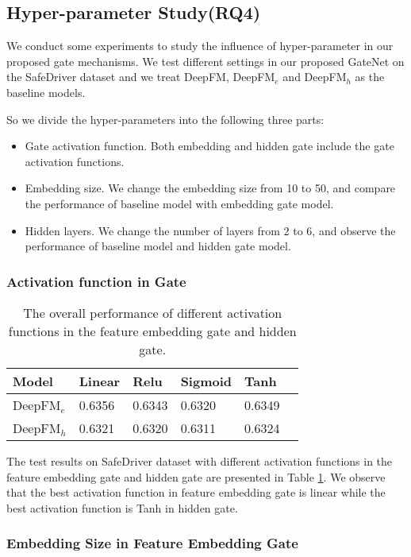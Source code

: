 \documentclass[sigconf,nonacm=true]{acmart}
\begin{document}
\subsection{Hyper-parameter Study(RQ4)}
We conduct some experiments to study the influence of hyper-parameter in our proposed gate mechanisms.
We test different settings in our proposed GateNet on the SafeDriver dataset and 
we treat DeepFM, DeepFM$_e$ and DeepFM$_h$ as the baseline models.

So we divide the hyper-parameters into the following three parts: 
\begin{itemize}
  \item Gate activation function. Both embedding and hidden gate include the gate activation functions.
  \item Embedding size. We change the embedding size from 10 to 50, and compare the performance of baseline model with embedding gate model.
  \item Hidden layers. We change the number of layers from 2 to 6, and observe the performance of baseline model and hidden gate model.
\end{itemize}

\subsubsection{Activation function in Gate}
\begin{table}[!htbp]
  \centering
  \caption{The overall performance of different activation functions in the feature embedding gate and hidden gate.}
  \label{table:t6}
  \begin{tabular}{llllll}
    Model & Linear & Relu & Sigmoid & Tanh\\ \hline
    DeepFM$_{e}$ & 0.6356 & 0.6343 & 0.6320 & 0.6349  \\
    DeepFM$_{h}$ & 0.6321 & 0.6320 & 0.6311 & 0.6324  \tabularnewline \bottomrule
\end{tabular}
\end{table}
The test results on SafeDriver dataset with different activation functions in the feature embedding gate and hidden gate are presented in Table \ref{table:t6}.
We observe that the best activation function in feature embedding gate is linear while the best activation function is Tanh in hidden gate.

\subsubsection{Embedding Size in Feature Embedding Gate}
\end{document}
